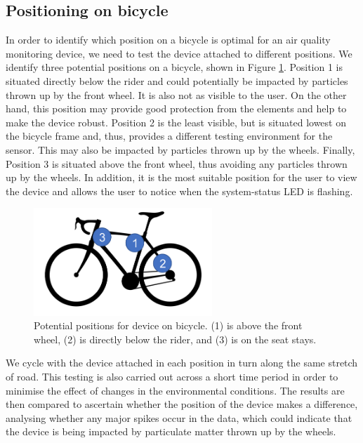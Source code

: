 \documentclass[11pt]{report}
\begin{document}
\subsection{Positioning on bicycle} \label{position_testing}

In order to identify which position on a bicycle is optimal for an air quality monitoring device, we need to test the device attached to different positions. We identify three potential positions on a bicycle, shown in Figure \ref{bicycle_positions}. Position 1 is situated directly below the rider and could potentially be impacted by particles thrown up by the front wheel. It is also not as visible to the user. On the other hand, this position may provide good protection from the elements and help to make the device robust. Position 2 is the least visible, but is situated lowest on the bicycle frame and, thus, provides a different testing environment for the sensor. This may also be impacted by particles thrown up by the wheels. Finally, Position 3 is situated above the front wheel, thus avoiding any particles thrown up by the wheels. In addition, it is the most suitable position for the user to view the device and allows the user to notice when the system-status LED is flashing. 

\begin{figure}[!tb]
\centering
\includegraphics[width=0.6\textwidth]{images/bicycle_positions}
\caption[Device positions on bicycle.]{Potential positions for device on bicycle. (1) is above the front wheel, (2) is directly below the rider, and (3) is on the seat stays.}
\label{bicycle_positions}
\end{figure}

We cycle with the device attached in each position in turn along the same stretch of road. This testing is also carried out across a short time period in order to minimise the effect of changes in the environmental conditions. The results are then compared to ascertain whether the position of the device makes a difference, analysing whether any major spikes occur in the data, which could indicate that the device is being impacted by particulate matter thrown up by the wheels.
\end{document}
